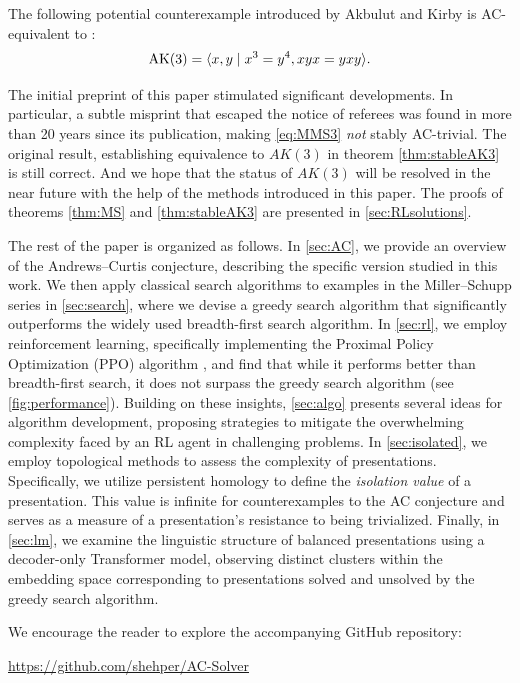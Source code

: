 \begin{theorem}\label{thm:stableAK3}
	The following potential counterexample introduced by Akbulut and Kirby \cite{Akbulut--Kirby} is AC-equivalent to :
	\[
	\text{AK}(3) = \langle x, y \mid x^3 = y^{4}, xyx = yxy\rangle.
	\]
\end{theorem}

\medskip\noindent
The initial preprint of this paper stimulated significant developments. In particular, a subtle misprint that escaped the notice of referees was found in \cite{MMS} more than 20 years since its publication, making \eqref{eq:MMS3} {\it not} stably AC-trivial. The original result, establishing equivalence to $AK(3)$ in theorem \ref{thm:stableAK3} is still correct. And we hope that the status of $AK(3)$ will be resolved in the near future with the help of the methods introduced in this paper.
%
The proofs of theorems \ref{thm:MS} and \ref{thm:stableAK3} are presented in \autoref{sec:RLsolutions}.

The rest of the paper is organized as follows. In \autoref{sec:AC}, we provide an overview of the Andrews--Curtis conjecture, describing the specific version studied in this work. We then apply classical search algorithms to examples in the Miller--Schupp series in \autoref{sec:search}, where we devise a greedy search algorithm that significantly outperforms the widely used breadth-first search algorithm. In \autoref{sec:rl}, we employ reinforcement learning, specifically implementing the Proximal Policy Optimization (PPO) algorithm \cite{schulman2017proximal}, and find that while it performs better than breadth-first search, it does not surpass the greedy search algorithm (see \autoref{fig:performance}). Building on these insights, \autoref{sec:algo} presents several ideas for algorithm development, proposing strategies to mitigate the overwhelming complexity faced by an RL agent in challenging problems. In \autoref{sec:isolated}, we employ topological methods to assess the complexity of presentations. Specifically, we utilize persistent homology to define the \textit{isolation value} of a presentation. This value is infinite for counterexamples to the AC conjecture and serves as a measure of a presentation's resistance to being trivialized. Finally, in \autoref{sec:lm}, we examine the linguistic structure of balanced presentations using a decoder-only Transformer model, observing distinct clusters within the embedding space corresponding to presentations solved and unsolved by the greedy search algorithm.

\medskip\noindent
We encourage the reader to explore the accompanying GitHub repository:
\begin{center}
	\href{https://github.com/shehper/AC-Solver}{https://github.com/shehper/AC-Solver}
\end{center}


